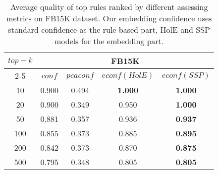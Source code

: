 \begin{table}[tbh]
\scriptsize
\centering
\begin{tabular}{|c|c|c|c|c|} 
 \hline
 \multirow{3}{*}{$top-k$} & \multicolumn{4}{|c|}{FB15K} \\
\cline{2-5}
 & $conf$ & $pcaconf$ & $econf(HolE)$ & $econf(SSP)$ \\
 \hline
10 & 0.900 & 0.494 & \textbf{1.000} & \textbf{1.000} \\
20 & 0.900 & 0.349 & 0.950 & \textbf{1.000} \\
50 & 0.881 & 0.357 & 0.936 & \textbf{0.937} \\
100 & 0.855 & 0.373 & 0.885 & \textbf{0.895} \\
200 & 0.842 & 0.373 & 0.870 & \textbf{0.875} \\
500 & 0.795 & 0.348 & 0.805 & \textbf{0.805} \\
 \hline
\end{tabular}
\newline
\caption{Average quality of top rules ranked by different assessing metrics on FB15K dataset. Our embedding confidence uses standard confidence as the rule-based part, HolE and SSP models for the embedding part.}
\label{table:fb15k_quality}
\end{table}
